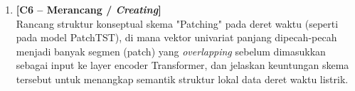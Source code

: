 \documentclass[11pt,a4paper]{article}
\begin{document}
\begin{enumerate}[leftmargin=1.8em, label=\textbf{Soal \arabic*.}]
    \item \textbf{[C6 -- Merancang / \textit{Creating}]} \\
    Rancang struktur konseptual skema "Patching" pada deret waktu (seperti pada model PatchTST), di mana vektor univariat panjang dipecah-pecah menjadi banyak segmen (patch) yang \textit{overlapping} sebelum dimasukkan sebagai input ke layer encoder Transformer, dan jelaskan keuntungan skema tersebut untuk menangkap semantik struktur lokal data deret waktu listrik.
    \vspace{4.5cm}

\end{enumerate}
\end{document}
